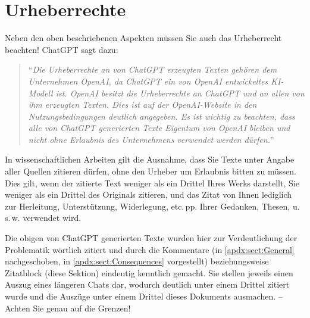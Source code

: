 \section{Urheberrechte}\label{apdx:sect:Copyright}
Neben den oben beschriebenen Aspekten müssen Sie auch das Urheberrecht beachten! Chat\-GPT sagt dazu:

\blockquote{\enquote{\emph{Die Urheberrechte an von ChatGPT erzeugten Texten gehören dem Unternehmen Open\-AI, da ChatGPT ein von OpenAI entwickeltes KI-Modell ist. OpenAI besitzt die Urheberrechte an ChatGPT und an allen von ihm erzeugten Texten. Dies ist auf der OpenAI-Website in den Nutzungsbedingungen deutlich angegeben. Es ist wichtig zu beachten, dass alle von ChatGPT generierten Texte Eigentum von OpenAI bleiben und nicht ohne Erlaubnis des Unternehmens verwendet werden dürfen.}}}

In wissenschaftlichen Arbeiten gilt die Ausnahme, dass Sie Texte unter Angabe aller Quellen zitieren dürfen, ohne den Urheber um Erlaubnis bitten zu müssen. Dies gilt, wenn der zitierte Text weniger als ein Drittel Ihres Werks darstellt, Sie weniger als ein Drittel des Originals zitieren, und das Zitat von Ihnen lediglich zur Herleitung, Unterstützung, Widerlegung, etc.\,pp. Ihrer Gedanken, Thesen, u.\,s.\,w. verwendet wird.

Die obigen von ChatGPT generierten Texte wurden hier zur Verdeutlichung der Problematik wörtlich zitiert und durch die Kommentare (in \ref{apdx:sect:General} nachgeschoben, in \ref{apdx:sect:Consequences} vorgestellt) beziehungsweise Zitatblock (diese Sektion) eindeutig kenntlich gemacht. Sie stellen jeweils einen Auszug eines längeren Chats dar, wodurch deutlich unter einem Drittel zitiert wurde und die Auszüge unter einem Drittel dieses Dokuments ausmachen. --\,Achten Sie genau auf die Grenzen!